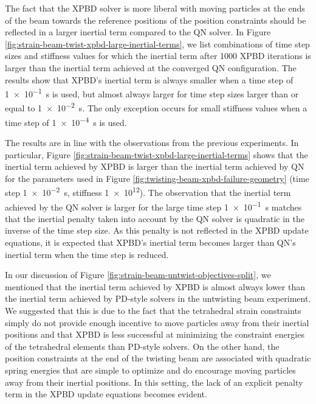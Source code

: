 The fact that the XPBD solver is more liberal with moving particles at the ends of the beam towards the reference positions of the position constraints 
should be reflected in a larger inertial term compared to the QN solver. In Figure \ref{fig:strain-beam-twist-xpbd-large-inertial-terms}, we list combinations 
of time step sizes and stiffness values for which the inertial term after 1000 XPBD iterations is larger than the inertial term achieved at the converged 
QN configuration. The results show that XPBD's inertial term is always smaller when a time step of \SI{1e-1}{\second} is used, but almost always larger for 
time step sizes larger than or equal to \SI{1e-2}{\second}. The only exception occurs for small stiffness values when a time step of \SI{1e-4}{\second} is 
used.

The results are in line with the observations from the previous experiments. In particular, Figure \ref{fig:strain-beam-twist-xpbd-large-inertial-terms} shows 
that the inertial term achieved by XPBD is larger than the inertial term achieved by QN for the parameters used in 
Figure \ref{fig:twisting-beam-xpbd-failure-geometry} (time step \SI{1e-2}{\second}, stiffness \num{1e12}). The observation that the inertial term achieved by 
the QN solver is larger for the large time step \SI{1e-1}{\second} matches that the inertial penalty taken into account by the QN solver 
is quadratic in the inverse of the time step size. As this penalty is not reflected in the XPBD update equations, it is expected 
that XPBD's inertial term becomes larger than QN's inertial term when the time step is reduced. 

In our discussion of Figure \ref{fig:strain-beam-untwist-objectives-split}, we mentioned that the inertial term achieved by 
XPBD is almost always lower than the inertial term achieved by PD-style solvers in the untwisting beam experiment. We suggested that this is due to the 
fact that the tetrahedral strain constraints simply do not provide enough incentive to move particles away from their inertial positions and that XPBD is 
less successful at minimizing the constraint energies of the tetrahedral elements than PD-style solvers. On the other hand, the position constraints at 
the end of the twisting beam are associated with quadratic spring energies that are simple to optimize and do encourage moving particles 
away from their inertial positions. In this setting, the lack of an explicit penalty term in the XPBD update equations becomes evident.

